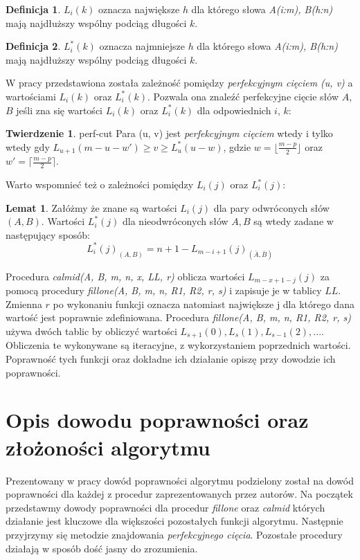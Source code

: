 \documentclass[12pt]{article}
\theoremstyle{definition}
\newtheorem{definition}{Definicja}[section]
\theoremstyle{definition}
\newtheorem{theorem}{Twierdzenie}[section]
\theoremstyle{definition}
\newtheorem{lemma}{Lemat}[section]
\begin{document}
\begin{definition}{}
$L_i(k)$ oznacza największe $h$ dla którego słowa \textit{A(i:m), B(h:n)} mają najdłuższy wspólny podciąg długości $k$.
\end{definition}

\begin{definition}
$L_i^*(k)$ oznacza najmniejsze $h$ dla którego słowa \textit{A(i:m), B(h:n)} mają najdłuższy wspólny podciąg długości $k$.
\end{definition}

\noindent W pracy przedstawiona została zależność pomiędzy \textit{perfekcyjnym cięciem (u, v)} a wartościami $L_i(k)$ oraz $L_i^*(k)$. Pozwala ona znaleźć perfekcyjne cięcie słów $A$, $B$ jeśli zna się wartości $L_i(k)$ oraz $L_i^*(k)$ dla odpowiednich $i$, $k$:

\begin{theorem}{}{perf-cut}
Para (u, v) jest \textit{perfekcyjnym cięciem} wtedy i tylko wtedy gdy $L_{u+1}(m - u - w') \geq v \geq L^*_u(u - w)$, gdzie $w = \lfloor\frac{m-p}{2}\rfloor$ oraz $w' = \lceil\frac{m-p}{2}\rceil$.
\end{theorem}

Warto wspomnieć też o zależności pomiędzy $L_i(j)$ oraz $L_i^*(j)$:
\begin{lemma}
Załóżmy że znane są wartości $L_i(j)$ dla pary odwróconych słów $(A, B)$. Wartości $L_i^*(j)$ dla nieodwróconych słów $A, B$ są wtedy zadane w następujący sposób:
\[
    L_i^*(j)_{(A, B)} = n + 1 - L_{m-i+1}(j)_{(\bar{A}, \bar{B})}
\]
\end{lemma}

Procedura \textit{calmid(A, B, m, n, x, LL, r)} oblicza wartości $L_{m-x+1-j}(j)$ za pomocą procedury \textit{fillone(A, B, m, n, R1, R2, r, s)} i zapisuje je w tablicy $LL$. Zmienna $r$ po wykonaniu funkcji oznacza natomiast największe j dla którego dana wartość jest poprawnie zdefiniowana. Procedura \textit{fillone(A, B, m, n, R1, R2, r, s)} używa dwóch tablic by obliczyć wartości $L_{s+1}(0), L_s(1), L_{s-1}(2), ...$. Obliczenia te wykonywane są iteracyjne, z wykorzystaniem poprzednich wartości. Poprawność tych funkcji oraz dokładne ich działanie opiszę przy dowodzie ich poprawności.


\section{Opis dowodu poprawności oraz złożoności algorytmu}
Prezentowany w pracy dowód poprawności algorytmu podzielony został na dowód poprawności dla każdej z procedur zaprezentowanych przez autorów. Na początek przedstawmy dowody poprawności dla procedur \textit{fillone} oraz \textit{calmid} których działanie jest kluczowe dla większości pozostałych funkcji algorytmu. Następnie przyjrzymy się metodzie znajdowania \textit{perfekcyjnego cięcia}. Pozostałe procedury działają w sposób dość jasny do zrozumienia.
\end{document}
